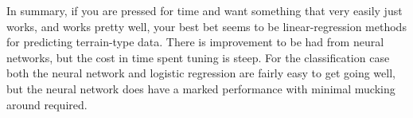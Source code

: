 \documentclass[reprint, english, nofootinbib]{revtex4-2}
\begin{document}

In summary, if you are pressed for time and want something that very easily just works, and works pretty well, your best bet seems to be linear-regression methods for predicting terrain-type data. There is improvement to be had from neural networks, but the cost in time spent tuning is steep. For the classification case both the neural network and logistic regression are fairly easy to get going well, but the neural network does have a marked performance with minimal mucking around required.


\onecolumngrid

\newpage
\twocolumngrid
\appendix
\end{document}
